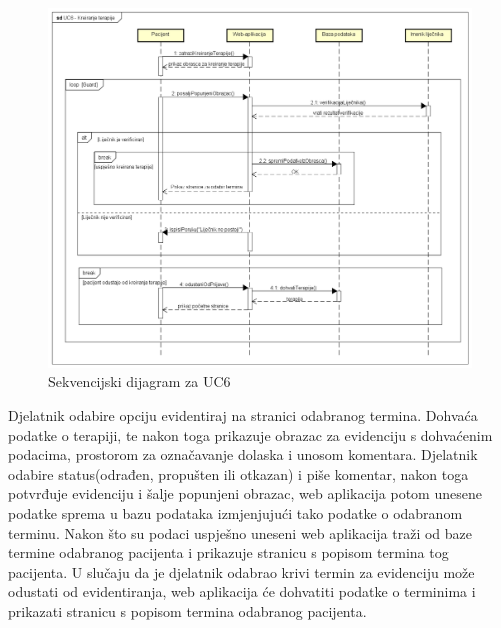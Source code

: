 				
				\begin{figure}[H]
					\includegraphics[scale=0.4]{slike/UC6_Kreiranje_terapije.PNG} %
					\centering
					\caption{Sekvencijski dijagram za UC6}
					\label{fig:sekvencijski_dijagram_1}
				\end{figure}
				
				\textbf{}
				
				Djelatnik odabire opciju evidentiraj na stranici odabranog termina. Dohvaća podatke o terapiji, te nakon toga prikazuje obrazac za evidenciju s dohvaćenim podacima, prostorom za označavanje dolaska i unosom komentara. Djelatnik odabire status(odrađen, propušten ili otkazan) i piše komentar, nakon toga potvrđuje evidenciju i šalje popunjeni obrazac, web aplikacija potom unesene podatke sprema u bazu podataka izmjenjujući tako podatke o odabranom terminu. Nakon što su podaci uspješno uneseni web aplikacija traži od baze termine odabranog pacijenta i prikazuje stranicu s popisom termina tog pacijenta. U slučaju da je djelatnik odabrao krivi termin za evidenciju može odustati od evidentiranja, web aplikacija će dohvatiti podatke o terminima i prikazati stranicu s popisom termina odabranog pacijenta.
				
